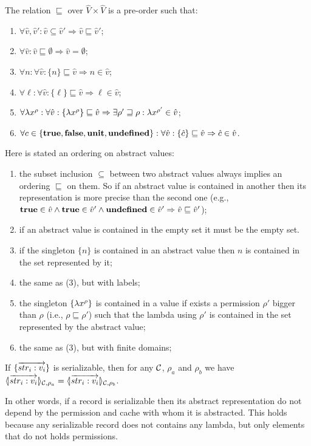 \begin{assumption}
\label{asm:ordering}
The relation $\sqsubseteq$ over $\hat{V} \times \hat{V}$ is a pre-order such that:
\begin{enumerate}
\item $\forall \hat{v},\hat{v}': \hat{v} \subseteq \hat{v}' \Rightarrow \hat{v} \sqsubseteq \hat{v}'$;
\item $\forall \hat{v}: \hat{v} \sqsubseteq \emptyset \Rightarrow \hat{v} = \emptyset$;
\item $\forall n: \forall \hat{v}: \{n\} \sqsubseteq \hat{v} \Rightarrow n \in \hat{v}$;
\item $\forall \ell: \forall \hat{v}: \{\ell\} \sqsubseteq \hat{v} \Rightarrow \ell \in \hat{v}$;
\item $\forall \lambda x^{\rho}: \forall \hat{v}: \{\lambda x^{\rho}\} \sqsubseteq \hat{v} \Rightarrow \exists \rho' \sqsupseteq \rho: \lambda x^{\rho'} \in \hat{v}$;
\item $\forall c \in \{\mathbf{true},\mathbf{false},\mathbf{unit},\mathbf{undefined}\}: \forall \hat{v}: \{\hat{c}\} \sqsubseteq \hat{v} \Rightarrow \hat{c} \in \hat{v}$.
\end{enumerate}
\end{assumption}
Here is stated an ordering on abstract values:
\begin{enumerate}
\item the subset inclusion $\subseteq$ between two abstract values always implies an ordering $\sqsubseteq$ on them. So if an abstract value is contained in another then its representation is more precise than the second one (e.g., $\mathbf{true}\in \hat{v} \wedge \mathbf{true}\in\hat{v}' \wedge \mathbf{undefined}\in\hat{v}' \Rightarrow \hat{v} \sqsubseteq \hat{v}'$);
\item if an abstract value is contained in the empty set it must be the empty set.
\item if the singleton $\{n\}$ is contained in an abstract value then $n$ is contained in the set represented by it;
\item the same as (3), but with labels;
\item the singleton $\{\lambda x^{\rho}\}$ is contained in a value if exists a permission $\rho'$ bigger than $\rho$ (i.e., $\rho \sqsubseteq \rho'$) such that the lambda using $\rho'$ is contained in the set represented by the abstract value;
\item the same as (3), but with finite domains;
\end{enumerate}

\begin{assumption}
\label{asm:serializable-rec}
If $\{\overrightarrow{str_i:v_i}\}$ is serializable, then for any ${\cal C}$, $\rho_a$ and $\rho_b$ we have $\langle\!| \overrightarrow{str_i:v_i} |\!\rangle_{{\cal C},\rho_a} = \langle\!| \overrightarrow{str_i:v_i} |\!\rangle_{{\cal C},\rho_b}$.
\end{assumption}
In other words, if a record is serializable then its abstract representation do not depend by the permission and cache with whom it is abstracted. This holds because any serializable record does not contains any lambda, but only elements that do not holds permissions.


